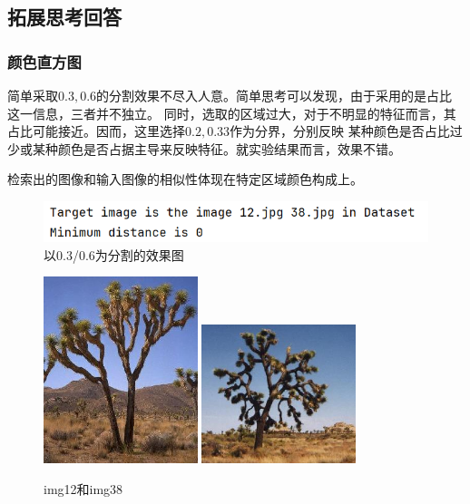 \documentclass{article}
\begin{document}
\subsection{拓展思考回答}

\subsubsection{颜色直方图}

    简单采取\(0.3, 0.6\)的分割效果不尽入人意。简单思考可以发现，由于采用的是占比这一信息，三者并不独立。
    同时，选取的区域过大，对于不明显的特征而言，其占比可能接近。因而，这里选择\(0.2, 0.33\)作为分界，分别反映
    某种颜色是否占比过少或某种颜色是否占据主导来反映特征。就实验结果而言，效果不错。

    检索出的图像和输入图像的相似性体现在特定区域颜色构成上。

\begin{figure}[h]
\centering
\includegraphics[width=1\textwidth]{./p0306}
\caption{以0.3/0.6为分割的效果图}
\end{figure}

\begin{figure}[h]
\centering
\includegraphics[width=0.4\textwidth]{./Dataset/12}
\includegraphics[width=0.4\textwidth]{./Dataset/38}
\caption{img12和img38}
\end{figure}
\end{document}
